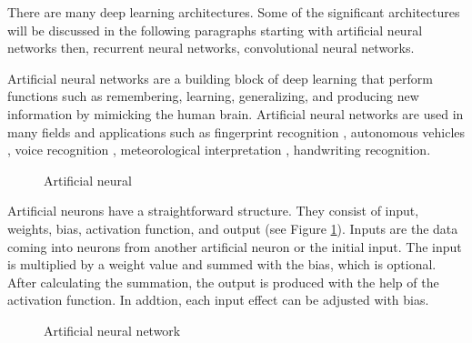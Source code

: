 There are many deep learning architectures. Some of the significant architectures will be discussed in the following paragraphs starting with artificial neural networks then, recurrent neural networks, convolutional neural networks. 

Artificial neural networks are a building block of deep learning that perform functions such as remembering, learning, generalizing, and producing new information by mimicking the human brain. Artificial neural networks are used in many fields and applications such as fingerprint recognition \cite{baldi1993neural}, autonomous vehicles \cite{tian2018deeptest}, voice recognition \cite{melin2006voice}, meteorological interpretation \cite{hsieh1998applying}, handwriting recognition\cite{oh2002class}.

\begin{figure}[htbp]
\centering
{}
\caption{Artificial neural \cite{veronez2011regional}}
\label{fig:MethodologyArtificialNeural}
\end{figure}

Artificial neurons have a straightforward structure. They consist of input, weights, bias, activation function, and output (see Figure \ref{fig:MethodologyArtificialNeural}). Inputs are the data coming into neurons from another artificial neuron or the initial input. The input is multiplied by a weight value and summed with the bias, which is optional. After calculating the summation, the output is produced with the help of the activation function. In addtion, each input effect can be adjusted with bias.

\begin{figure}[htbp]
\centering
{}
\caption{Artificial neural network\cite{bre2018prediction}}
\label{fig:MethodologyArtificialNeuralNetwork}
\end{figure}

